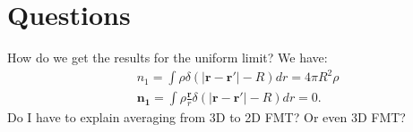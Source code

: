 \documentclass[11pt, a4paper]{article}
\theoremstyle{definition}
\begin{document}
	
	\section{Questions}
	How do we get the results for the uniform limit?
	We have:
	\begin{align*}
		&n_1 = \int \rho \delta( |\mathbf{r - r'}| - R)d r = 4 \pi R^2 \rho \\
		&\mathbf{n_1} = \int \rho \frac{\mathbf {r}}{r} \delta( |\mathbf{r - r'}| - R)d r = 0.
	\end{align*}
	Do I have to explain averaging from 3D to 2D FMT? Or even 3D FMT?
	
	
\end{document}
